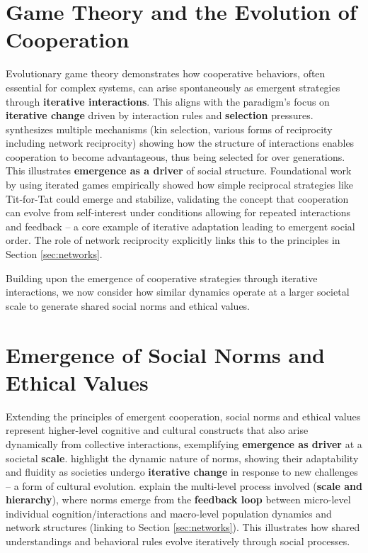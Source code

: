 \documentclass[12pt,openany]{book}
\begin{document}
\section{Game Theory and the Evolution of Cooperation} \label{sec:game_theory}
Evolutionary game theory demonstrates how cooperative behaviors, often essential for complex systems, can arise spontaneously as emergent strategies through \textbf{iterative interactions}. This aligns with the paradigm's focus on \textbf{iterative change} driven by interaction rules and \textbf{selection} pressures. \citet{nowak2006five} synthesizes multiple mechanisms (kin selection, various forms of reciprocity including network reciprocity) showing how the structure of interactions enables cooperation to become advantageous, thus being selected for over generations. This illustrates \textbf{emergence as a driver} of social structure. Foundational work by \citet{axelrod1981evolution} using iterated games empirically showed how simple reciprocal strategies like Tit-for-Tat could emerge and stabilize, validating the concept that cooperation can evolve from self-interest under conditions allowing for repeated interactions and feedback – a core example of iterative adaptation leading to emergent social order. The role of network reciprocity explicitly links this to the principles in Section \ref{sec:networks}.

Building upon the emergence of cooperative strategies through iterative interactions, we now consider how similar dynamics operate at a larger societal scale to generate shared social norms and ethical values.

\section{Emergence of Social Norms and Ethical Values} \label{sec:social_norms}
Extending the principles of emergent cooperation, social norms and ethical values represent higher-level cognitive and cultural constructs that also arise dynamically from collective interactions, exemplifying \textbf{emergence as driver} at a societal \textbf{scale}. \citet{vriens2024social} highlight the dynamic nature of norms, showing their adaptability and fluidity as societies undergo \textbf{iterative change} in response to new challenges – a form of cultural evolution. \citet{hawkins2019emergence} explain the multi-level process involved (\textbf{scale and hierarchy}), where norms emerge from the \textbf{feedback loop} between micro-level individual cognition/interactions and macro-level population dynamics and network structures (linking to Section \ref{sec:networks}). This illustrates how shared understandings and behavioral rules evolve iteratively through social processes.
\end{document}
